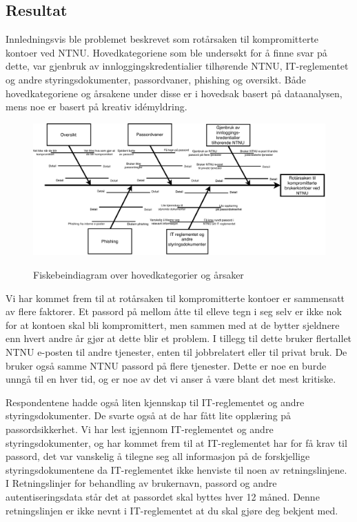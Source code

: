 \subsection{Resultat}
Innledningsvis ble problemet beskrevet som rotårsaken til kompromitterte kontoer ved NTNU. Hovedkategoriene som ble undersøkt for å finne svar på dette, var gjenbruk av innloggingskredentialier tilhørende NTNU, IT-reglementet og andre styringsdokumenter, passordvaner, phishing og oversikt. Både hovedkategoriene og årsakene under disse er i hovedsak basert på dataanalysen, mens noe er basert på kreativ idémyldring. 

\begin{figure}[H]
    \centering
    \includegraphics[scale=1.1, angle=90]{case_2/bilder/fiskebein.pdf}
    \label{fig:fiskebein-case2}
    \caption[Fiskebein-case2]{Fiskebeindiagram over hovedkategorier og årsaker}
\end{figure}

Vi har kommet frem til at rotårsaken til kompromitterte kontoer er sammensatt av flere faktorer. Et passord på mellom åtte til elleve tegn i seg selv er ikke nok for at kontoen skal bli kompromittert, men sammen med at de bytter sjeldnere enn hvert andre år gjør at dette blir et problem. I tillegg til dette bruker flertallet NTNU e-posten til andre tjenester, enten til jobbrelatert eller til privat bruk. De bruker også samme NTNU passord på flere tjenester. Dette er noe en burde unngå til en hver tid, og er noe av det vi anser å være blant det mest kritiske. 

Respondentene hadde også liten kjennskap til IT-reglementet og andre styringsdokumenter. De svarte også at de har fått lite opplæring på passordsikkerhet. Vi har lest igjennom IT-reglementet og andre styringsdokumenter, og har kommet frem til at IT-reglementet har for få krav til passord, det var vanskelig å tilegne seg all informasjon på de forskjellige styringsdokumentene da IT-reglementet ikke henviste til noen av retningslinjene. I Retningslinjer for behandling av brukernavn, passord og andre autentiseringsdata \cite{RetnBPA} står det at passordet skal byttes hver 12 måned. Denne retningslinjen er ikke nevnt i IT-reglementet at du skal gjøre deg bekjent med. 

